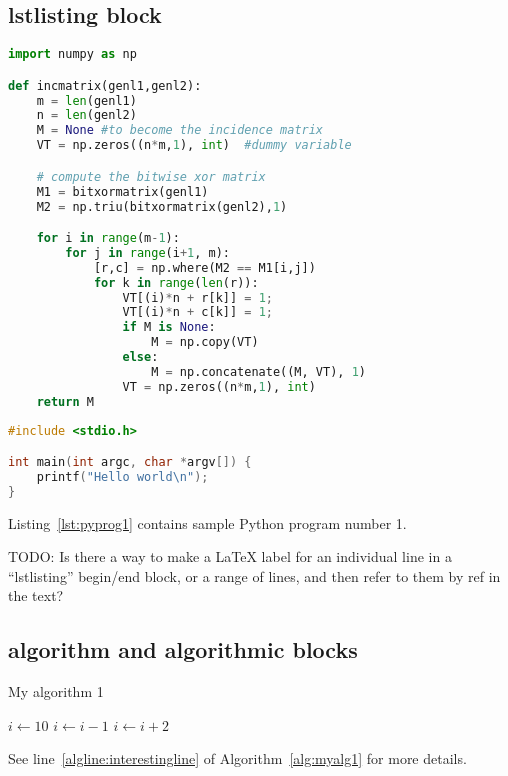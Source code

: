 \documentclass[acmsmall]{acmart}
\newcommand{\todo}[1]{}
\renewcommand{\todo}[1]{{\color{red} TODO: {#1}}}
\begin{document}
\subsection{lstlisting block}

\lstset{numbers=left}

\begin{lstlisting}[language=Python,float,label=lst:pyprog1,caption={A sample Python listing},frame=single]
import numpy as np

def incmatrix(genl1,genl2):
    m = len(genl1)
    n = len(genl2)
    M = None #to become the incidence matrix
    VT = np.zeros((n*m,1), int)  #dummy variable

    # compute the bitwise xor matrix
    M1 = bitxormatrix(genl1)
    M2 = np.triu(bitxormatrix(genl2),1)

    for i in range(m-1):
        for j in range(i+1, m):
            [r,c] = np.where(M2 == M1[i,j])
            for k in range(len(r)):
                VT[(i)*n + r[k]] = 1;
                VT[(i)*n + c[k]] = 1;
                if M is None:
                    M = np.copy(VT)
                else:
                    M = np.concatenate((M, VT), 1)
                VT = np.zeros((n*m,1), int)
    return M
\end{lstlisting}

\begin{lstlisting}[language=C,float,label=lst:Cprog1,caption={A sample C listing},frame=single]
#include <stdio.h>

int main(int argc, char *argv[]) {
    printf("Hello world\n");
}
\end{lstlisting}

Listing~\ref{lst:pyprog1} contains sample Python program number 1.

\todo{Is there a way to make a \LaTeX{} label for an individual line
  in a ``lstlisting'' begin/end block, or a range of lines, and then
  refer to them by ref in the text?}


\subsection{algorithm and algorithmic blocks}

\begin{algorithm}
\caption{My algorithm 1}
\label{alg:myalg1}
\begin{algorithmic}[1]
\State $i \gets 10$
    \State $i \gets i-1$   \label{algline:interestingline}
\Else
        \State $i \gets i+2$  
    \EndIf
\EndIf
\end{algorithmic}
\end{algorithm}

See line~\ref{algline:interestingline} of Algorithm~\ref{alg:myalg1} for more details.
\end{document}
